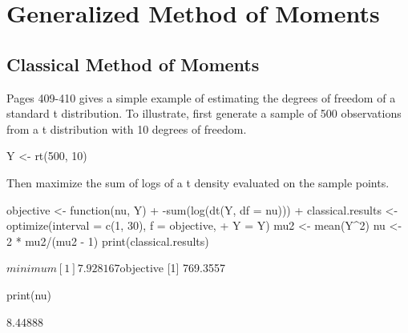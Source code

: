 \documentclass[a4paper]{article}
\renewcommand{\~}{\perispomeni}%
\begin{document}
\section{Generalized Method of Moments}
\subsection{Classical Method of Moments}
Pages 409-410 gives a simple example of estimating the degrees of freedom of a standard t distribution. 
To illustrate, first generate a sample of 500 observations from a t distribution with 10 degrees of freedom.
\begin{Schunk}
\begin{Sinput}
 Y <- rt(500, 10)
\end{Sinput}
\end{Schunk}
Then maximize the sum of logs of a t density evaluated on the sample points.
\begin{Schunk}
\begin{Sinput}
 objective <- function(nu, Y) {
+     -sum(log(dt(Y, df = nu)))
+ }
 classical.results <- optimize(interval = c(1, 30), f = objective, 
+     Y = Y)
 mu2 <- mean(Y^2)
 nu <- 2 * mu2/(mu2 - 1)
 print(classical.results)
\end{Sinput}
\begin{Soutput}
$minimum
[1] 7.928167

$objective
[1] 769.3557
\end{Soutput}
\begin{Sinput}
 print(nu)
\end{Sinput}
\begin{Soutput}
[1] 8.44888
\end{Soutput}
\end{Schunk}
\end{document}
